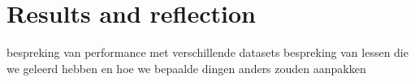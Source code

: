\section{Results and reflection}
\label{chapter:results}
bespreking van performance met verschillende datasets
bespreking van lessen die we geleerd hebben en hoe we bepaalde dingen anders zouden aanpakken



